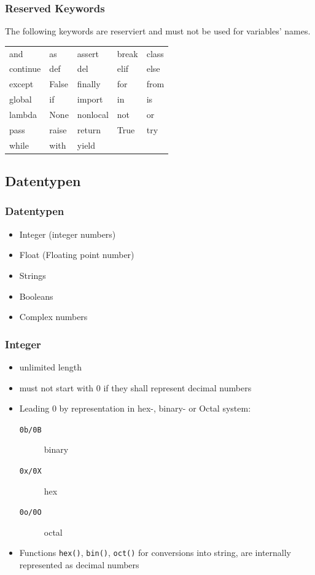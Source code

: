 \documentclass[ngerman]{beamer}
\begin{document}
\begin{frame}
\frametitle{Reserved Keywords}

The following  keywords are reserviert and must not be used for variables' names.

\begin{center}
\begin{tabular}{p{}p{}p{}p{}p{}}
and	&	as	&	assert	&	break	&	class	\\
continue	&	def	&	del	&	elif	&	else	\\
except	&	False	&	finally	&	for	&	from	\\
global	&	if	&	import	&	in	&	is	\\
lambda	&	None	&	nonlocal	&	not	&	or	\\
pass	&	raise	&	return	&	True	&	try	\\
while	&	with	&	yield	&		&		\\
\end{tabular}
\end{center}
\end{frame}



\subsection{Datentypen}

\begin{frame}
\frametitle{Datentypen}


\begin{itemize}
\item Integer (integer numbers)
\item Float (Floating point number)
\item Strings
\item Booleans
\item Complex numbers
\end{itemize}
\end{frame}

\begin{frame}
\frametitle{Integer}

\begin{itemize}
\item unlimited length
\item must not start with 0 if they shall represent decimal numbers 
\item Leading 0 by representation in hex-, binary- or Octal system:
\begin{description}
\item[\texttt{0b/0B}] binary
\item[\texttt{0x/0X}] hex
\item[\texttt{0o/0O}] octal
\end{description}
\item Functions \texttt{hex()}, \texttt{bin()}, \texttt{oct()} for conversions into string, are internally represented as decimal numbers 
\end{itemize}
\end{frame}
\end{document}
